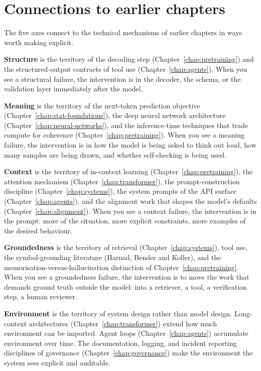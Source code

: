 \section{Connections to earlier chapters}

The five axes connect to the technical mechanisms of earlier
chapters in ways worth making explicit.

\textbf{Structure} is the territory of the decoding step
(Chapter~\ref{chap:pretraining}) and the structured-output contracts of tool use
(Chapter~\ref{chap:agents}). When you see a structural failure, the
intervention is in the decoder, the schema, or the validation
layer immediately after the model.

\textbf{Meaning} is the territory of the next-token prediction
objective (Chapter~\ref{chap:stat-foundations}), the deep neural network architecture
(Chapter~\ref{chap:neural-networks}), and the inference-time techniques that trade
compute for coherence (Chapter~\ref{chap:pretraining}). When you see a meaning
failure, the intervention is in how the model is being asked
to think out loud, how many samples are being drawn, and
whether self-checking is being used.

\textbf{Context} is the territory of in-context learning
(Chapter~\ref{chap:pretraining}), the attention mechanism (Chapter~\ref{chap:transformer}), the
prompt-construction discipline (Chapter~\ref{chap:systems}), the system
prompts of the API surface (Chapter~\ref{chap:agents}), and the alignment
work that shapes the model's defaults (Chapter~\ref{chap:alignment}). When you
see a context failure, the intervention is in the prompt: more
of the situation, more explicit constraints, more examples of
the desired behaviour.

\textbf{Groundedness} is the territory of retrieval (Chapter~\ref{chap:systems}),
tool use, the symbol-grounding literature (Harnad, Bender and
Koller), and the memorisation-versus-hallucination distinction
of Chapter~\ref{chap:pretraining}. When you see a groundedness failure, the
intervention is to move the work that demands ground truth
outside the model: into a retriever, a tool, a verification
step, a human reviewer.

\textbf{Environment} is the territory of system design rather
than model design. Long-context architectures (Chapter~\ref{chap:transformer})
extend how much environment can be imported. Agent loops
(Chapter~\ref{chap:agents}) accumulate environment over time. The
documentation, logging, and incident reporting disciplines of
governance (Chapter~\ref{chap:governance}) make the environment the system sees
explicit and auditable.

